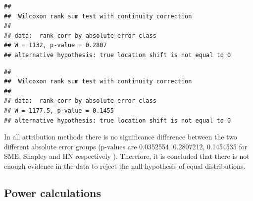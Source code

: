 \documentclass[
  12pt,
  a4paper]{article}
\newenvironment{Shaded}{\begin{snugshade}}{\end{snugshade}}
\newcommand{\CommentTok}[1]{\textcolor[rgb]{0.56,0.35,0.01}{\textit{#1}}}
\newcommand{\FunctionTok}[1]{\textcolor[rgb]{0.13,0.29,0.53}{\textbf{#1}}}
\newcommand{\NormalTok}[1]{#1}
\newcommand{\OtherTok}[1]{\textcolor[rgb]{0.56,0.35,0.01}{#1}}
\newcommand{\SpecialCharTok}[1]{\textcolor[rgb]{0.81,0.36,0.00}{\textbf{#1}}}
\newcommand{\StringTok}[1]{\textcolor[rgb]{0.31,0.60,0.02}{#1}}
\begin{document}
\begin{verbatim}
## 
##  Wilcoxon rank sum test with continuity correction
## 
## data:  rank_corr by absolute_error_class
## W = 1132, p-value = 0.2807
## alternative hypothesis: true location shift is not equal to 0
\end{verbatim}

\begin{verbatim}
## 
##  Wilcoxon rank sum test with continuity correction
## 
## data:  rank_corr by absolute_error_class
## W = 1177.5, p-value = 0.1455
## alternative hypothesis: true location shift is not equal to 0
\end{verbatim}

In all attribution methods there is no significance difference between
the two different absolute error groups (p-values are 0.0352554,
0.2807212, 0.1454535 for SME, Shapley and HN respectively ). Therefore,
it is concluded that there is not enough evidence in the data to reject
the null hypothesis of equal distributions.

\hypertarget{power-calculations}{%
\subsection{Power calculations}\label{power-calculations}}

\begin{Shaded}
\end{Shaded}
\end{document}
